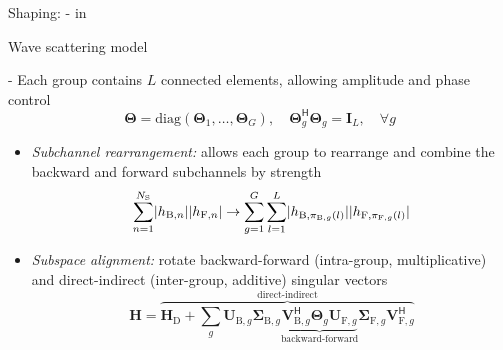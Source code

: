 \documentclass[presentation,xcolor={table},9pt]{beamer}
\begin{document}
\begin{section}{Shaping: - in }
\begin{frame}{Wave scattering model}
		\begin{block}{-}
			Each group contains $L$ connected elements, allowing amplitude and phase control
			\vspace{-0.25cm}
			\begin{equation*}
				\mathbf{\Theta} = \mathrm{diag}(\mathbf{\Theta}_1,\ldots,\mathbf{\Theta}_G), \quad \mathbf{\Theta}_g^\mathsf{H} \mathbf{\Theta}_g = \mathbf{I}_L, \quad \forall g
				\label{eq:bd_ris}
			\end{equation*}
			\vspace{-0.5cm}
			\begin{itemize}
				\item \emph{Subchannel rearrangement:} allows each group to rearrange and combine the backward and forward subchannels by strength
				\vspace{-0.25cm}
				\begin{equation*}
					\sum_{n=1}^{N_\mathrm{S}} \lvert h_{\mathrm{B},n} \rvert \lvert h_{\mathrm{F},n} \rvert \to \sum_{g=1}^{G} \sum_{l=1}^{L} \lvert h_{\mathrm{B},\pi_{\mathrm{B},g}(l)} \rvert \lvert h_{\mathrm{F},\pi_{\mathrm{F},g}(l)} \rvert
					\vspace{-0.25cm}
				\end{equation*}
				\item \emph{Subspace alignment:} rotate backward-forward (intra-group, multiplicative) and direct-indirect (inter-group, additive) singular vectors
				\vspace{-0.25cm}
				\begin{equation*}
					\mathbf{H} = \overbrace{\mathbf{H}_\mathrm{D} + \sum_g \mathbf{U}_{\mathrm{B},g} \mathbf{\Sigma}_{\mathrm{B},g} \underbrace{\mathbf{V}_{\mathrm{B},g}^\mathsf{H} \mathbf{\Theta}_g \mathbf{U}_{\mathrm{F},g}}_\text{backward-forward} \mathbf{\Sigma}_{\mathrm{F},g} \mathbf{V}_{\mathrm{F},g}^\mathsf{H}}^\text{direct-indirect}
					\label{eq:channel_equivalent_svd}
				\end{equation*}
			\end{itemize}
		\end{block}
	\end{frame}


\end{section}
\end{document}
